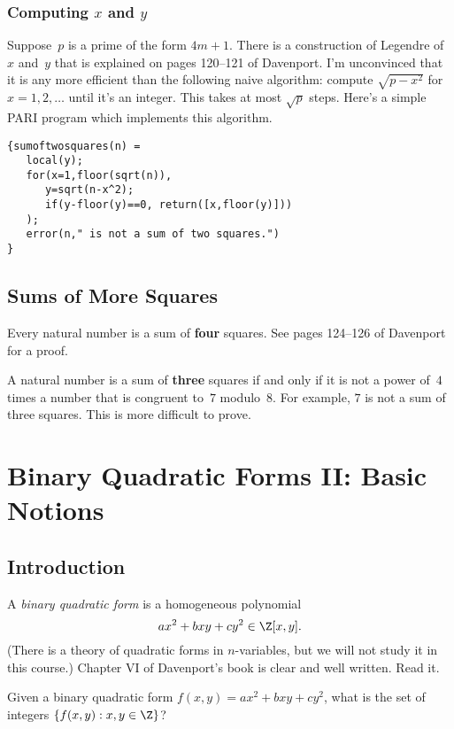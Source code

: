 \documentclass[11pt]{report}
\begin{document}
\subsection{Computing $x$ and $y$}
Suppose~$p$ is a prime of the form $4m+1$.  There is a construction of
Legendre of~$x$ and~$y$ that is explained on pages 120--121 of
Davenport.  I'm unconvinced that it is any more efficient than the
following naive algorithm: compute $\sqrt{p-x^2}$ for $x=1,2,\ldots$
until it's an integer.  This takes at most $\sqrt{p}$ steps.  Here's
a simple PARI program which implements this algorithm.

\begin{verbatim}
{sumoftwosquares(n) =
   local(y);
   for(x=1,floor(sqrt(n)),
      y=sqrt(n-x^2); 
      if(y-floor(y)==0, return([x,floor(y)]))
   );
   error(n," is not a sum of two squares.")
}
\end{verbatim}

\section{Sums of More Squares}
Every natural number is a sum of {\bf four} squares.  See pages
124--126 of Davenport for a proof.

A natural number is a sum of {\bf three} squares if and only if it is not a
power of~$4$ times a number that is congruent to~$7$ modulo~$8$.  For
example, $7$ is not a sum of three squares.  This is more difficult to
prove.






\chapter{Binary Quadratic Forms II: Basic Notions}



\section{Introduction}
A {\em binary quadratic form} is a homogeneous polynomial
$$
  ax^2 + bxy + cy^2 \in\Z[x,y].
$$
(There is a theory of quadratic forms in $n$-variables, but we will
not study it in this course.)  Chapter VI of Davenport's book is clear
and well written.  Read it.

  {\sf Given a binary quadratic form
  $f(x,y) = ax^2 + bxy + cy^2$,
  what is the set of integers $\{f(x,y) : x, y\in\Z\}$?}\vspace{1ex}
\end{document}

